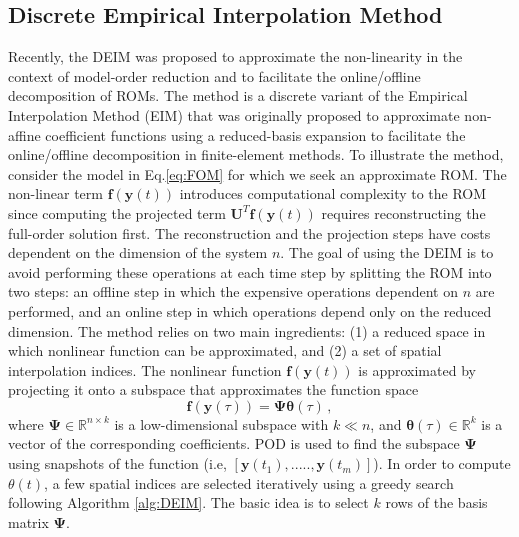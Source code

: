 \documentclass[]{interact}
\theoremstyle{plain}%
\theoremstyle{definition}
\theoremstyle{remark}
\begin{document}

\subsection{Discrete Empirical Interpolation Method}

\label{sec:DEIM}
Recently, the DEIM \cite{chaturantabut2010nonlinear} was proposed to approximate the non-linearity in the context of model-order reduction and to facilitate the online/offline decomposition of ROMs.
The method is a discrete variant of the Empirical Interpolation Method (EIM) \cite{barrault2004empirical} that was originally proposed to approximate non-affine coefficient functions using a reduced-basis expansion to facilitate the online/offline decomposition in finite-element methods.
To illustrate the method, consider the model in Eq.\ref{eq:FOM} for which we seek an approximate ROM.
The non-linear term $\mathbf{f}(\textbf{y}(t))$ introduces computational complexity to the ROM since computing the projected term $\mathbf{U}^T\mathbf{f}(\textbf{y}(t))$ requires reconstructing the full-order  solution first.
The reconstruction and the projection steps have costs dependent on the dimension of the system $n$.
The goal of using the DEIM is to avoid performing these operations at each time step by splitting the ROM into two steps: an offline step in which the expensive operations dependent on $n$ are performed, and an online step in which operations depend only on the reduced dimension.
The method relies on two main ingredients: (1) a reduced space in which nonlinear function can be approximated, and (2) a set of spatial interpolation indices.
The nonlinear function $\mathbf{f}(\textbf{y}(t))$ is approximated by projecting it onto a subspace that approximates the function space
\begin{equation}
	\mathbf{f}(\textbf{y}(\tau)) = \mathbf{\Psi}\boldsymbol{\theta}(\tau)\, ,
\end{equation}
where $\mathbf{\Psi} \in \mathbb{R}^{n\times k}$ is a low-dimensional subspace with $k \ll n$, and $\boldsymbol{\theta}(\tau) \in \mathbb{R}^k$ is a vector of the corresponding coefficients.
POD is used to find the subspace $\mathbf{\Psi}$ using snapshots of the function (i.e, $[\textbf{y}(t_1), ....., \textbf{y}(t_m)]$).
In order to compute $\theta(t)$, a few spatial indices are selected iteratively using a greedy search following Algorithm \ref{alg:DEIM}.
The basic idea is to select $k$ rows of the basis matrix $\mathbf{\Psi}$.
\end{document}
